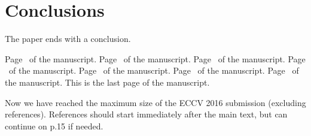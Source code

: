\documentclass[runningheads]{llncs}
\begin{document}
\section{Conclusions}

The paper ends with a conclusion. 


\clearpage\mbox{}Page \thepage\ of the manuscript.
\clearpage\mbox{}Page \thepage\ of the manuscript.
\clearpage\mbox{}Page \thepage\ of the manuscript.
\clearpage\mbox{}Page \thepage\ of the manuscript.
\clearpage\mbox{}Page \thepage\ of the manuscript.
\clearpage\mbox{}Page \thepage\ of the manuscript.
\clearpage\mbox{}Page \thepage\ of the manuscript.
This is the last page of the manuscript.
\par\vfill\par
Now we have reached the maximum size of the ECCV 2016 submission (excluding references).
References should start immediately after the main text, but can continue on p.15 if needed.

\clearpage



\end{document}
